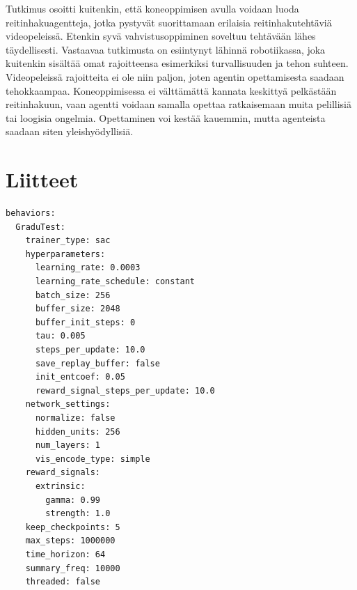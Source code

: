 \documentclass[utf8]{gradu3}
\begin{document}
Tutkimus osoitti kuitenkin, että koneoppimisen avulla voidaan luoda reitinhakuagentteja, jotka pystyvät suorittamaan erilaisia reitinhakutehtäviä videopeleissä. Etenkin syvä vahvistusoppiminen soveltuu tehtävään lähes täydellisesti. Vastaavaa tutkimusta on esiintynyt lähinnä robotiikassa, joka kuitenkin sisältää omat rajoitteensa esimerkiksi turvallisuuden ja tehon suhteen. Videopeleissä rajoitteita ei ole niin paljon, joten agentin opettamisesta saadaan tehokkaampaa. Koneoppimisessa ei välttämättä kannata keskittyä pelkästään reitinhakuun, vaan agentti voidaan samalla opettaa ratkaisemaan muita pelillisiä tai loogisia ongelmia. Opettaminen voi kestää kauemmin, mutta agenteista saadaan siten yleishyödyllisiä.

\printbibliography

\chapter{Liitteet}
\label{liitteet}

\begin{verbatim}
behaviors:
  GraduTest:
    trainer_type: sac
    hyperparameters:
      learning_rate: 0.0003
      learning_rate_schedule: constant
      batch_size: 256
      buffer_size: 2048
      buffer_init_steps: 0
      tau: 0.005
      steps_per_update: 10.0
      save_replay_buffer: false
      init_entcoef: 0.05
      reward_signal_steps_per_update: 10.0
    network_settings:
      normalize: false
      hidden_units: 256
      num_layers: 1
      vis_encode_type: simple
    reward_signals:
      extrinsic:
        gamma: 0.99
        strength: 1.0
    keep_checkpoints: 5
    max_steps: 1000000
    time_horizon: 64
    summary_freq: 10000
    threaded: false
\end{verbatim}
\end{document}
